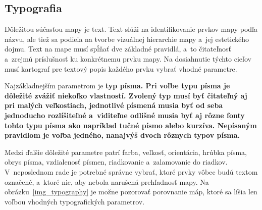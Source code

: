 \subsection*{Typografia}
Dôležitou súčasťou mapy je text. Text slúži na identifikovanie prvkov mapy podľa názvu, ale tiež sa podieľa na tvorbe vizuálnej hierarchie mapy a~jej estetického dojmu. Text na mape musí spĺňať dve základné pravidlá, a~to čitateľnosť a~zrejmú príslušnosť ku konkrétnemu prvku mapy. Na dosiahnutie týchto cieľov musí kartograf pre textový popis každého prvku vybrať vhodné parametre. 

Najzákladnejším parametrom je \bf typ písma\rm. Pri voľbe typu písma je dôležité zvážiť niekoľko vlastností. Zvolený typ musí byť čitateľný aj pri malých veľkostiach, jednotlivé písmená musia byť od seba jednoducho rozlíšiteľné a~viditeľne odlišné musia byť aj rôzne fonty tohto typu písma ako napríklad tučné písmo alebo kurzíva. Nepísaným pravidlom je voľba jedného, nanajvýš dvoch rôznych typov písma.~\cite{typography}

Medzi ďalšie dôležité parametre patrí farba, veľkosť, orientácia, hrúbka písma, obrys písma, vzdialenosť písmen, riadkovanie a~zalamovanie do riadkov. V~neposlednom rade je potrebné správne vybrať, ktoré prvky vôbec budú textom označené, a~ktoré nie, aby nebola narušená prehľadnosť mapy. Na obrázku~\ref{img_typography} je možne pozorovať porovnanie máp, ktoré sa líšia len voľbou vhodných typografických parametrov.

